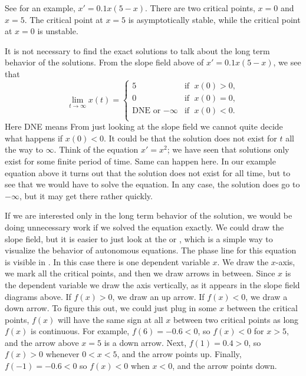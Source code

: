 See  for an example, $x' = 0.1 x(5-x)$.
There are two critical points, $x=0$ and $x=5$.  The critical point
at $x=5$ is asymptotically stable, while the critical point at $x=0$ is
unstable.

It is not necessary to find the exact solutions to talk about the long
term behavior of the solutions.  From the slope field above of
$x' = 0.1 x(5-x)$, we 
see that
\begin{equation*}
\lim_{t\to \infty} x(t) = 
\begin{cases}
5 & \text{if } \; x(0) > 0 , \\
0 & \text{if } \; x(0) = 0 , \\
\text{DNE or } {-\infty} & \text{if } \; x(0) < 0 . \\
\end{cases}
\end{equation*}
Here DNE means   From just looking at the slope field we
cannot quite decide what happens if $x(0) < 0$.  It could be that the
solution does not exist for $t$ all the way to $\infty$.
Think of the equation $x' = x^2$; we
have seen that solutions only exist for some finite period of time.  Same can happen
here.  In our example equation above it turns out that the
solution does not exist for all time, but to see that we would have to solve
the equation.  In any case, the solution does go to $-\infty$, but it may get
there rather quickly.


If we are interested only in the long term behavior of the solution, 
we would be doing unnecessary work if we solved the
equation exactly.
We could draw the slope field, but
it is easier to just look at the \emph{} or
\emph{}, which is a simple
way to visualize the behavior of
autonomous equations.  The phase line for this equation is visible in . In this case there is one dependent variable $x$.
We draw the $x$-axis, we mark all the critical points,
and then we draw arrows in
between.  Since $x$ is the dependent variable we draw the axis vertically,
as it appears in the slope field diagrams above.
If $f(x) > 0$, we draw an up arrow.  If $f(x) < 0$, we draw 
a down arrow.
To figure this out, we could just plug in some $x$ between the critical
points, $f(x)$ will have the same sign at all $x$ between two critical
points as long $f(x)$ is continuous.
For example, $f(6) = -0.6 < 0$, so $f(x) < 0$ for $x > 5$,
and the arrow above $x=5$ is a down
arrow.  Next, $f(1) = 0.4 > 0$, so $f(x) > 0$ whenever $0 < x < 5$, and
the arrow points up.  Finally, $f(-1) = -0.6 < 0$ so $f(x) < 0$ when $x <
0$, and the arrow points down.

